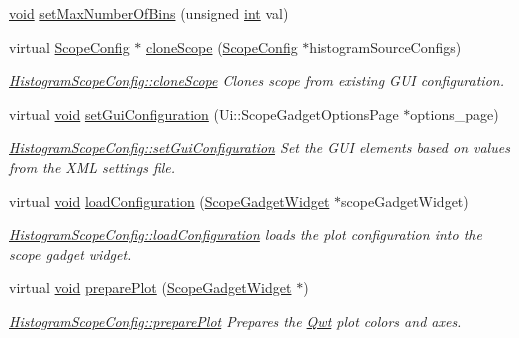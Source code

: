 \begin{DoxyCompactItemize}
\hyperlink{group___u_a_v_objects_plugin_ga444cf2ff3f0ecbe028adce838d373f5c}{void} \hyperlink{group___scope_plugin_ga9fc3929f75679aa143e96e9919de54ac}{set\-Max\-Number\-Of\-Bins} (unsigned \hyperlink{ioapi_8h_a787fa3cf048117ba7123753c1e74fcd6}{int} val)
\item 
virtual \hyperlink{class_scope_config}{Scope\-Config} $\ast$ \hyperlink{group___scope_plugin_gaf687cd062ff03c3a6dcf3edb05d29662}{clone\-Scope} (\hyperlink{class_scope_config}{Scope\-Config} $\ast$histogram\-Source\-Configs)
\begin{DoxyCompactList}\small\item\em \hyperlink{group___scope_plugin_gaf687cd062ff03c3a6dcf3edb05d29662}{Histogram\-Scope\-Config\-::clone\-Scope} Clones scope from existing G\-U\-I configuration. \end{DoxyCompactList}\item 
virtual \hyperlink{group___u_a_v_objects_plugin_ga444cf2ff3f0ecbe028adce838d373f5c}{void} \hyperlink{group___scope_plugin_ga575b4cb9a8b9a9ad8e236487a3da570b}{set\-Gui\-Configuration} (Ui\-::\-Scope\-Gadget\-Options\-Page $\ast$options\-\_\-page)
\begin{DoxyCompactList}\small\item\em \hyperlink{group___scope_plugin_ga575b4cb9a8b9a9ad8e236487a3da570b}{Histogram\-Scope\-Config\-::set\-Gui\-Configuration} Set the G\-U\-I elements based on values from the X\-M\-L settings file. \end{DoxyCompactList}\item 
virtual \hyperlink{group___u_a_v_objects_plugin_ga444cf2ff3f0ecbe028adce838d373f5c}{void} \hyperlink{group___scope_plugin_gace592757ce86fefdc0848379d6833748}{load\-Configuration} (\hyperlink{class_scope_gadget_widget}{Scope\-Gadget\-Widget} $\ast$scope\-Gadget\-Widget)
\begin{DoxyCompactList}\small\item\em \hyperlink{group___scope_plugin_gace592757ce86fefdc0848379d6833748}{Histogram\-Scope\-Config\-::load\-Configuration} loads the plot configuration into the scope gadget widget. \end{DoxyCompactList}\item 
virtual \hyperlink{group___u_a_v_objects_plugin_ga444cf2ff3f0ecbe028adce838d373f5c}{void} \hyperlink{group___scope_plugin_gaaf43bfcb7e79e657acda463cb66d854c}{prepare\-Plot} (\hyperlink{class_scope_gadget_widget}{Scope\-Gadget\-Widget} $\ast$)
\begin{DoxyCompactList}\small\item\em \hyperlink{group___scope_plugin_gaaf43bfcb7e79e657acda463cb66d854c}{Histogram\-Scope\-Config\-::prepare\-Plot} Prepares the \hyperlink{namespace_qwt}{Qwt} plot colors and axes. \end{DoxyCompactList}\item 

\end{DoxyCompactItemize}
